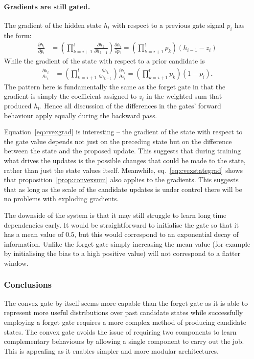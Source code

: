 \paragraph{Gradients are still gated.}
The gradient of the hidden state \(h_t\) with respect to a previous gate signal
\(p_i\) has the form:
\begin{align}
	\frac{\partial h_t}{\partial p_i} &= 
		\left(\prod_{k=i+1}^t \frac{\partial h_k}{\partial h_{k-1}}\right) 
			\frac{\partial h_i}{\partial p_i} 
	= \left( \prod_{k=i+1}^t p_k \right) (h_{i-1} - z_i) \label{eq:cvexgrad}
\end{align}
While the gradient of the state with respect to a prior candidate is
\begin{align}
	\frac{\partial h_t}{\partial z_i} &=
		\left(\prod_{k=i+1}^t \frac{\partial h_k}{\partial h_{k-1}}\right) 
			\frac{\partial h_i}{\partial z_i}
	= \left( \prod_{k=i+1}^t p_k \right) (1 - p_i). \label{eq:cvexstategrad}
\end{align} The pattern here is fundamentally the same as the forget gate in that the gradient
is simply the coefficient assigned to \(z_i\) in the weighted sum that produced \(h_t\). Hence
all discussion of the differences in the gates' forward behaviour apply equally during the
backward pass.

Equation~\eqref{eq:cvexgrad} is interesting -- the gradient of the state with respect to the gate value
depends not just on the preceding state but on the difference between the state and the proposed
update. This suggests that during training what drives the updates is the possible changes that could be
made to the state, rather than just the state values itself. Meanwhile, eq.~\eqref{eq:cvexstategrad}
shows that proposition~\ref{prop:convexsum} also applies to the gradients. 
This suggests that as long as the scale of the candidate updates is under control
there will be no problems with exploding gradients.

The downside of the system is that it may still struggle to learn long time dependencies early.
It would be straightforward to initialise the gate so that it has a mean value of \(0.5\),
but this would correspond to an exponential decay of information. Unlike the forget gate simply
increasing the mean value (for example by initialising the bias to a high positive value)
will not correspond to a flatter window.


\subsubsection{Conclusions}
The convex gate by itself seems more capable than the forget gate as it is able to represent more
useful distributions over past candidate states while successfully employing a forget gate requires a more
complex method of producing candidate states. The convex gate avoids the issue of requiring
two components to learn complementary behaviours by allowing a single component to carry out the job.
This is appealing as it enables simpler and more modular architectures.


